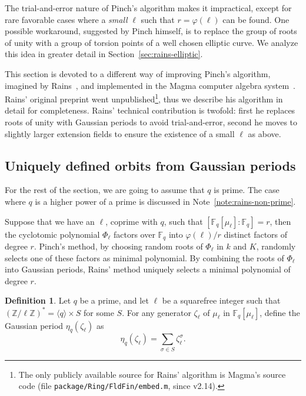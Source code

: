 \documentclass[12pt]{article}
\theoremstyle{plain}
\theoremstyle{definition}
\newtheorem{definition}[theorem]{Definition}
\def\Z{\ensuremath{\mathbb{Z}}}
\def\F{\ensuremath{\mathbb{F}}}
\def\euler{\ensuremath{\varphi}}
\newcounter{algorithm}
\begin{document}
The trial-and-error nature of Pinch's algorithm makes it impractical,
except for rare favorable cases where a \emph{small} $\ell$ such that
$r=\euler(\ell)$ can be found. One possible workaround, suggested by
Pinch himself, is to replace the group of roots of unity with a group
of torsion points of a well chosen elliptic curve. We analyze this
idea in greater detail in Section~\ref{sec:rains-elliptic}.

This section is devoted to a different way of improving Pinch's
algorithm, imagined by Rains~\cite{rains2008}, and implemented in the
Magma computer algebra system~\cite{MAGMA}. Rains' original preprint
went unpublished\footnote{The only publicly available source for
  Rains' algorithm is Magma's source code (file
  \texttt{package/Ring/FldFin/embed.m}, since v2.14).}, thus we
describe his algorithm in detail for completeness. Rains' technical
contribution is twofold: first he replaces roots of unity with
Gaussian periods to avoid trial-and-error, second he moves to slightly
larger extension fields to ensure the existence of a small $\ell$ as
above.

\subsection{Uniquely defined orbits from Gaussian periods}

For the rest of the section, we are going to assume that $q$ is
prime. The case where $q$ is a higher power of a prime is discussed in
Note~\ref{note:rains-non-prime}.

Suppose that we have an $\ell$, coprime with $q$, such that
$[\F_q[\mu_\ell]:\F_q]=r$, then the cyclotomic polynomial $\Phi_\ell$
factors over $\F_q$ into $\euler(\ell)/r$ distinct factors of degree
$r$. Pinch's method, by choosing random roots of $\Phi_\ell$ in $k$
and $K$, randomly selects one of these factors as minimal polynomial.
By combining the roots of $\Phi_\ell$ into Gaussian periods, Rains'
method uniquely selects a minimal polynomial of degree $r$.

\begin{definition}
  Let $q$ be a prime, and let $\ell$ be a squarefree integer such that
  $(\Z/\ell\Z)^\ast = \langle q\rangle \times S$ for some $S$.  For any
  generator $\zeta_\ell$ of $\mu_\ell$ in $\F_q[\mu_\ell]$, define the
  Gaussian period $\eta_q(\zeta_\ell)$ as
  \begin{equation}
    \eta_q(\zeta_\ell) = \sum_{\sigma\in S}{\zeta_\ell^{\sigma}}.
  \end{equation}
\end{definition}
\end{document}
